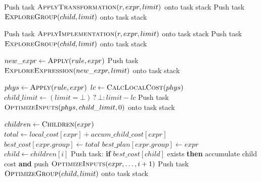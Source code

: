 \documentclass[fontsize=14pt, russian]{scrartcl}
\begin{document}
\begin{algorithm}[H]
    \caption{Алгоритм поиска (часть 2).}%
    \label{alg:cascades-search-2}
    \begin{algorithmic}[1]
            \State Push task $\Call{ApplyTransformation}{r, expr, limit}$ onto task stack
        \EndFor
                \State Push task $\Call{ExploreGroup}{child, limit}$ onto task stack
            \EndIf
        \EndFor
    \EndProcedure

            \State Push task $\Call{ApplyImplementation}{r, expr, limit}$ onto task stack
        \EndFor
                \State Push task $\Call{ExploreGroup}{child, limit}$ onto task stack
            \EndIf
        \EndFor
    \EndProcedure

        \State $new\_expr \leftarrow \Call{Apply}{rule, expr}$
        \State Push task $\Call{ExploreExpression}{new\_expr, limit}$ onto task stack
    \EndProcedure

        \State $phys \leftarrow \Call{Apply}{rule, expr}$
        \State $lc \leftarrow \Call{CalcLocalCost}{phys}$
            \State \Return
        \EndIf
        \State $child\_limit \leftarrow (limit = \bot) \mathbin{?} \bot \mathbin{:} limit - lc$
        \State Push task $\Call{OptimizeInputs}{phys, child\_limit, 0}$ onto task stack
    \EndProcedure
    \end{algorithmic}
\end{algorithm}

\begin{algorithm}[H]
    \caption{Алгоритм поиска (часть 3).}%
    \label{alg:cascades-search-3}
    \begin{algorithmic}[1]
        \State $children \leftarrow \Call{Children}{expr}$
            \State $total \leftarrow local\_cost[expr] + accum\_child\_cost[expr]$
                \State $best\_cost[expr.group] \leftarrow total$
                \State $best\_plan[expr.group] \leftarrow expr$
            \EndIf
            \State \Return
        \EndIf
        \State $child \leftarrow children[i]$
        \State Push task: \textbf{if} $best\_cost[child]$ exists \textbf{then} accumulate child cost \textbf{and} push $\Call{OptimizeInputs}{expr, \ldots, i+1}$
        \State Push task $\Call{OptimizeGroup}{child, limit}$ onto task stack
    \EndProcedure
    \end{algorithmic}
\end{algorithm}
\end{document}
